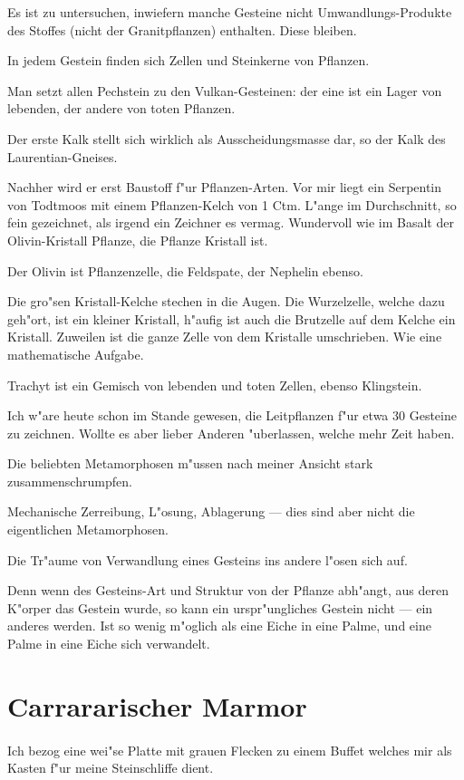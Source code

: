 \documentclass[a4paper, 11pt, oneside, german]{article}
\begin{document}
Es ist zu untersuchen, inwiefern manche Gesteine nicht Umwandlungs-Produkte des Stoffes (nicht der Granitpflanzen) enthalten. Diese bleiben.

In jedem Gestein finden sich Zellen und Steinkerne von Pflanzen.

Man setzt allen Pechstein zu den Vulkan-Gesteinen: der eine ist ein Lager von lebenden, der andere von toten Pflanzen.

Der erste Kalk stellt sich wirklich als Ausscheidungsmasse dar, so der Kalk des Laurentian-Gneises.

Nachher wird er erst Baustoff f"ur Pflanzen-Arten. Vor mir liegt ein Serpentin von Todtmoos mit einem Pflanzen-Kelch von 1 Ctm. L"ange im Durchschnitt, so fein gezeichnet, als irgend ein Zeichner es vermag. Wundervoll wie im Basalt der Olivin-Kristall Pflanze, die Pflanze Kristall ist.

Der Olivin ist Pflanzenzelle, die Feldspate, der Nephelin ebenso.

Die gro"sen Kristall-Kelche stechen in die Augen. Die Wurzelzelle, welche dazu geh"ort, ist ein kleiner Kristall, h"aufig ist auch die Brutzelle auf dem Kelche ein Kristall. Zuweilen ist die ganze Zelle von dem Kristalle umschrieben. Wie eine mathematische Aufgabe.

Trachyt ist ein Gemisch von lebenden und toten Zellen, ebenso Klingstein.

Ich w"are heute schon im Stande gewesen, die Leitpflanzen f"ur etwa 30 Gesteine zu zeichnen. Wollte es aber lieber Anderen "uberlassen, welche mehr Zeit haben.

Die beliebten Metamorphosen m"ussen nach meiner Ansicht stark zusammenschrumpfen.

Mechanische Zerreibung, L"osung, Ablagerung --- dies sind aber nicht die eigentlichen Metamorphosen.

Die Tr"aume von Verwandlung eines Gesteins ins andere l"osen sich auf.

Denn wenn des Gesteins-Art und Struktur von der Pflanze abh"angt, aus deren K"orper das Gestein wurde, so kann ein urspr"ungliches Gestein nicht --- ein anderes werden. Ist so wenig m"oglich als eine Eiche in eine Palme, und eine Palme in eine Eiche sich verwandelt.
\clearpage
\section{Carrararischer Marmor}
\paragraph{}
Ich bezog eine wei"se Platte mit grauen Flecken zu einem Buffet welches mir als Kasten f"ur meine Steinschliffe dient.
\end{document}
